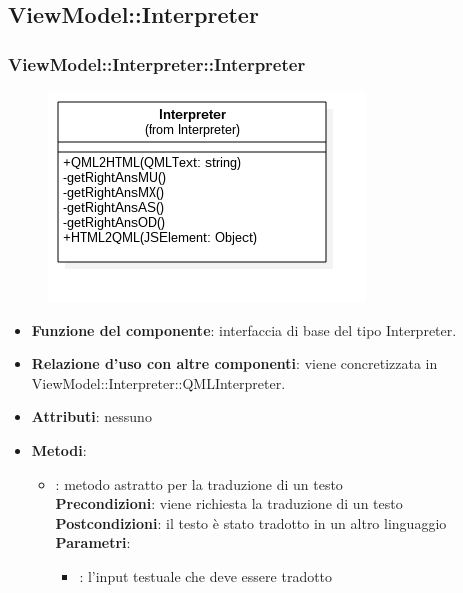 \subsection{ViewModel::Interpreter}
\subsubsection{ViewModel::Interpreter::Interpreter}
\begin{figure}[h!]
\begin{center}
	\includegraphics[scale=0.4]{../images/ViewModel/Interpreter/Interpreter.png}
\end{center}
\end{figure}
\begin{itemize}
\item\textbf{Funzione del componente}: interfaccia di base del tipo Interpreter.
	\item\textbf{Relazione d'uso con altre componenti}: viene concretizzata in ViewModel::Interpreter::QMLInterpreter.\\

\item\textbf{Attributi}: nessuno
\item\textbf{Metodi}:
	\begin{itemize}
		\item{}: metodo astratto per la traduzione di un testo\\
		\textbf{Precondizioni}: viene richiesta la traduzione di un testo\\
		\textbf{Postcondizioni}: il testo è stato tradotto in un altro linguaggio\\
		\textbf{Parametri}:
			\begin{itemize}
				\item{}: l'input testuale che deve essere tradotto \\
			\end{itemize}
	\end{itemize}
\end{itemize}
\newpage

